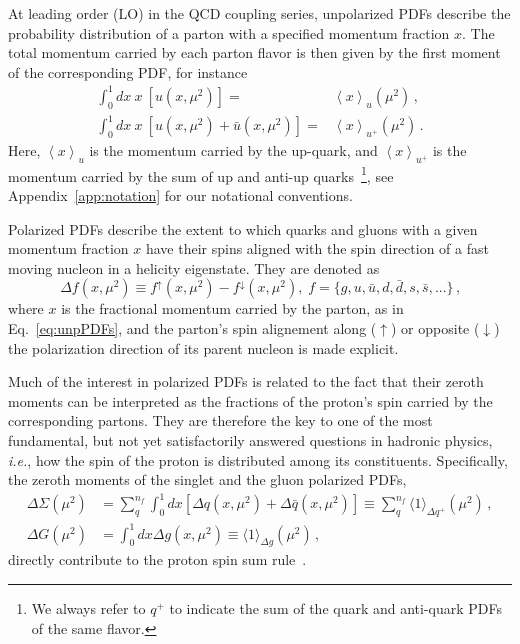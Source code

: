 At leading order (LO) in the QCD coupling series, unpolarized PDFs 
describe the probability distribution of a parton with a specified 
momentum fraction $x$.
%
The total momentum carried by each parton flavor is then given by 
the first moment of the corresponding PDF, for instance
%
\begin{align}
\int_{0}^{1}dx\ x\ \left[u(x,\mu^2)\right] 
= & {}  
\left\langle x\right\rangle _{u}(\mu^2)\,, \label{eq:umoment1}\\
\int_{0}^{1}dx\ x\ \left[u(x,\mu^2)+\bar{u}(x,\mu^2)\right] 
= & {} 
\left\langle x\right\rangle _{u^{+}}(\mu^2)\,. \label{eq:uplusmoment1}
\end{align}
%
Here, $\left\langle x\right\rangle _{u}$ is the momentum
carried by the up-quark, and $\left\langle x\right\rangle _{u^{+}}$ is
the momentum carried by the sum of up and anti-up quarks~\footnote{We always 
 refer to $q^+$ to indicate the sum of the quark and anti-quark PDFs of the 
 same flavor.},
see Appendix~\ref{app:notation} for our notational conventions.

Polarized PDFs describe the extent to which quarks and gluons 
with a given momentum fraction $x$ have their spins aligned with the spin 
direction of a fast moving nucleon in a helicity eigenstate. 
%
They are denoted as 
\begin{equation}
\Delta f(x,\mu^2) \equiv f^{\uparrow}(x,\mu^2) - f^{\downarrow}(x,\mu^2)
\mbox{,} \ \ f=\{g,u,\bar{u},d,\bar{d},s,\bar{s},...\}
\,\mbox{,}
\label{eq:polPDFs}
\end{equation}
where $x$ is the fractional 
momentum carried by the parton, as in Eq.~\eqref{eq:unpPDFs},  
and the parton's spin alignement along ($\uparrow$) or opposite 
($\downarrow$) the polarization direction of its parent nucleon
is made explicit.

Much of the interest in polarized PDFs is related to the fact that 
their zeroth moments can be interpreted as the fractions of the proton's 
spin carried by the corresponding partons.
%
They are therefore the key to one of the most fundamental, 
but not yet satisfactorily answered questions in hadronic physics,
{\it i.e.}, how the spin of the proton is distributed among its constituents.
%
Specifically, the zeroth moments of the singlet and the gluon polarized PDFs,
\begin{align}
\Delta\Sigma(\mu^2)
& =
\sum_{q}^{n_f}\int_0^1 dx 
\left[\Delta q(x, \mu^2) + \Delta\bar{q}(x, \mu^2)\right]
\equiv
\sum_q^{n_f}\langle 1 \rangle_{\Delta q^+}(\mu^2)\,,
\label{eq:singletmom}
\\
\Delta G(\mu^2)
& =
\int_0^1 dx \Delta g(x,\mu^2)
\equiv
\langle 1 \rangle_{\Delta g}(\mu^2)
\,,
\label{eq:moments}
\end{align}
directly contribute to the proton spin sum rule~\cite{Leader:2013jra}.

